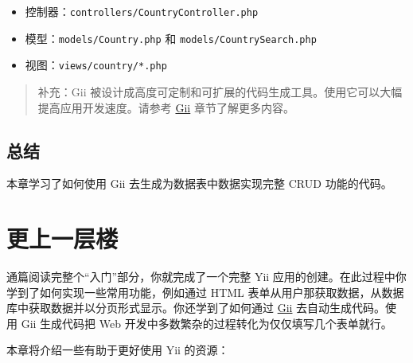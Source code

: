 \begin{itemize}
\item 控制器：\lstinline|controllers/CountryController.php|
\item 模型：\lstinline|models/Country.php| 和 \lstinline|models/CountrySearch.php|
\item 视图：\lstinline|views/country/*.php|
\end{itemize}
\begin{quote}补充：Gii 被设计成高度可定制和可扩展的代码生成工具。使用它可以大幅提高应用开发速度。请参考 \hyperref[tool-gii.md]{Gii} 章节了解更多内容。

\end{quote}
\subsection{总结 \label{start-gii.md::summary}}
本章学习了如何使用 Gii 去生成为数据表中数据实现完整 CRUD 功能的代码。



\label{start-looking-ahead.md}\section{更上一层楼}
通篇阅读完整个“入门”部分，你就完成了一个完整 Yii 应用的创建。在此过程中你学到了如何实现一些常用功能，例如通过 HTML 表单从用户那获取数据，从数据库中获取数据并以分页形式显示。你还学到了如何通过 \hyperref[tool-gii.md]{Gii} 去自动生成代码。使用 Gii 生成代码把 Web 开发中多数繁杂的过程转化为仅仅填写几个表单就行。

本章将介绍一些有助于更好使用 Yii 的资源：

